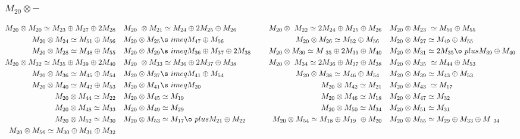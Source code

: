 \subsubsection{$M_20\otimes -$}
\begin{align*}
M_{20} \otimes M_{20} \simeq M_{23} \oplus M_{27} \oplus 2 M_{28} &&& M_{20} \
\otimes M_{21} \simeq M_{24} \oplus 2 M_{25} \oplus M_{26} &&& M_{20} \otimes \
M_{22} \simeq 2 M_{24} \oplus M_{25} \oplus M_{26} &&& M_{20} \otimes M_{23} \
\simeq M_{50} \oplus M_{55}\\
M_{20} \otimes M_{24} \simeq M_{51} \oplus M_{56} &&& M_{20} \otimes M_{25} \s\
imeq M_{47} \oplus M_{56} &&& M_{20} \otimes M_{26} \simeq M_{52} \oplus M_{56\
} &&& M_{20} \otimes M_{27} \simeq M_{49} \oplus M_{55}\\
M_{20} \otimes M_{28} \simeq M_{48} \oplus M_{55} &&& M_{20} \otimes M_{29} \s\
imeq M_{36} \oplus M_{37} \oplus 2 M_{38} &&& M_{20} \otimes M_{30} \simeq M_{\
35} \oplus 2 M_{39} \oplus M_{40} &&& M_{20} \otimes M_{31} \simeq 2 M_{35} \o\
plus M_{39} \oplus M_{40}\\
M_{20} \otimes M_{32} \simeq M_{35} \oplus M_{39} \oplus 2 M_{40} &&& M_{20} \
\otimes M_{33} \simeq M_{36} \oplus 2 M_{37} \oplus M_{38} &&& M_{20} \otimes \
M_{34} \simeq 2 M_{36} \oplus M_{37} \oplus M_{38} &&& M_{20} \otimes M_{35} \
\simeq M_{44} \oplus M_{53}\\
M_{20} \otimes M_{36} \simeq M_{45} \oplus M_{54} &&& M_{20} \otimes M_{37} \s\
imeq M_{41} \oplus M_{54} &&& M_{20} \otimes M_{38} \simeq M_{46} \oplus M_{54\
} &&& M_{20} \otimes M_{39} \simeq M_{43} \oplus M_{53}\\
M_{20} \otimes M_{40} \simeq M_{42} \oplus M_{53} &&& M_{20} \otimes M_{41} \s\
imeq M_{20} &&& M_{20} \otimes M_{42} \simeq M_{21} &&& M_{20} \otimes M_{43} \
\simeq M_{17}\\
M_{20} \otimes M_{44} \simeq M_{22} &&& M_{20} \otimes M_{45} \simeq M_{19} &&\
& M_{20} \otimes M_{46} \simeq M_{18} &&& M_{20} \otimes M_{47} \simeq M_{32}\
\\
M_{20} \otimes M_{48} \simeq M_{33} &&& M_{20} \otimes M_{49} \simeq M_{29} &&\
& M_{20} \otimes M_{50} \simeq M_{34} &&& M_{20} \otimes M_{51} \simeq M_{31}\
\\
M_{20} \otimes M_{52} \simeq M_{30} &&& M_{20} \otimes M_{53} \simeq M_{17} \o\
plus M_{21} \oplus M_{22} &&& M_{20} \otimes M_{54} \simeq M_{18} \oplus M_{19\
} \oplus M_{20} &&& M_{20} \otimes M_{55} \simeq M_{29} \oplus M_{33} \oplus M\
_{34}\\
M_{20} \otimes M_{56} \simeq M_{30} \oplus M_{31} \oplus M_{32}\\
\end{align*}

